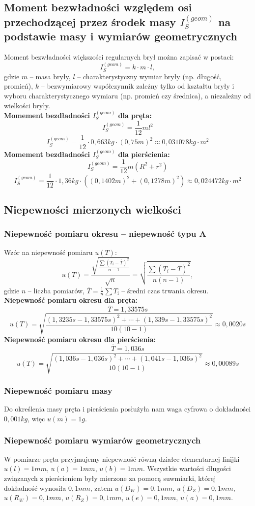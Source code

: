 \documentclass[a4paper,11pt]{article}
\begin{document}
\subsection{Moment bezwładności względem osi przechodzącej przez środek masy $I_{S}^{(geom)}$ na podstawie masy i wymiarów geometrycznych}
Moment bezwładności większości regularnych brył można zapisać w postaci: 
$$I_{S}^{(geom)} = k \cdot m \cdot l,$$ 
gdzie $m$ -- masa bryły, $l$ -- charakterystyczny wymiar bryły (np. długość, promień), $k$ -- bezwymiarowy współczynnik
zależny tylko od kształtu bryły i wyboru charakterystycznego wymiaru (np. promień czy średnica), a niezależny od wielkości bryły.
$$$$
\textbf{Momement bezdładności $I_{S}^{(geom)}$ dla pręta:
}$$I_{S}^{(geom)} = \dfrac{1}{12}ml^{2}$$
$$I_{S}^{(geom)} = \dfrac{1}{12}\cdot 0,663kg\cdot (0,75m)^{2}\approx 0,031078kg \cdot m^{2}$$
\textbf{Momement bezdładności $I_{S}^{(geom)}$ dla pierścienia:
}$$I_{S}^{(geom)} = \dfrac{1}{12}m(R^{2}+r^{2})$$
$$I_{S}^{(geom)} = \dfrac{1}{12}\cdot 1,36kg\cdot ((0,1402m)^{2}+(0,1278m)^{2})\approx 0,024472kg \cdot m^{2}$$


\subsection{Niepewności mierzonych wielkości}
\subsubsection{Niepewność pomiaru okresu -- niepewność typu A}
Wzór na niepewność pomiaru $u(T)$:
$$u(T)=\displaystyle \frac{\sqrt{\frac{\sum(T_{i}-\overline{T})^{2}}{n-1}}}{\sqrt{n}}=\displaystyle \sqrt{\frac{\sum(T_{i}-\overline{T})^{2}}{n(n-1)}},$$
gdzie $n$ -- liczba pomiarów, $\overline{T}=\frac{1}{n}\sum T_{\mathrm{i}}$ -- średni czas trwania okresu.
$$$$
\textbf{Niepewność pomiaru okresu dla pręta:}
$$\overline{T}=1,33575s$$ 
$$u(T)=\displaystyle \sqrt{\frac{(1,3235s-1,33575s)^{2}+\cdots +(1,339s-1,33575s)^{2}}{10(10-1)}}\approx 0,0020s$$
\textbf{Niepewność pomiaru okresu dla pierścienia:}
$$\overline{T}=1,036s$$ 
$$u(T)=\displaystyle \sqrt{\frac{(1,036s-1,036s)^{2}+\cdots +(1,041s-1,036s)^{2}}{10(10-1)}} \approx 0,00089s$$
\subsubsection{Niepewność pomiaru masy}
Do określenia masy pręta i pierścienia posłużyła nam waga cyfrowa o dokładności $0,001kg$, więc $u(m)=1g$.
\subsubsection{Niepewność pomiaru wymiarów geometrycznych}
W pomiarze pręta przyjmujemy niepewność równą działce elementarnej linijki $u(l)=1mm$, $u(a)=1mm$, $u(b)=1mm$. Wszystkie wartości długości związanych z pierścieniem były mierzone za pomocą suwmiarki, której dokładność wynosiła $0,1mm$, zatem $u(D_{W})=0,1mm$, $u(D_{Z})=0,1mm$, $u(R_{W})=0,1mm$, $u(R_{Z})=0,1mm$, $u(e)=0,1mm$, $u(a)=0,1mm$.
\end{document}
